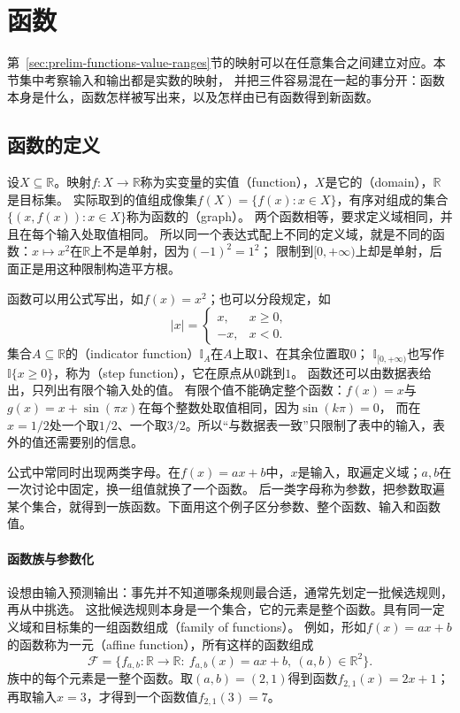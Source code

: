 \section{函数}
\label{sec:ru-functions}

第~\ref{sec:prelim-functions-value-ranges}节的映射可以在任意集合之间建立对应。本节集中考察输入和输出都是实数的映射，
并把三件容易混在一起的事分开：函数本身是什么，函数怎样被写出来，以及怎样由已有函数得到新函数。

\subsection{函数的定义}
\label{sec:ru-function-definition}

设$X\subseteq\mathbb R$。映射$f:X\to\mathbb R$称为实变量的实值（function），$X$是它的（domain），$\mathbb R$是目标集。
实际取到的值组成像集$f(X)=\{f(x):x\in X\}$，有序对组成的集合$\{(x,f(x)):x\in X\}$称为函数的（graph）。
两个函数相等，要求定义域相同，并且在每个输入处取值相同。
所以同一个表达式配上不同的定义域，就是不同的函数：$x\mapsto x^2$在$\mathbb R$上不是单射，因为$(-1)^2=1^2$；
限制到$[0,+\infty)$上却是单射，后面正是用这种限制构造平方根。

函数可以用公式写出，如$f(x)=x^2$；也可以分段规定，如
\[
 |x|=\begin{cases}x,&x\geq0,\\-x,&x<0.\end{cases}
\]
集合$A\subseteq\mathbb R$的（indicator function）$\mathbb I_A$在$A$上取$1$、在其余位置取$0$；
$\mathbb I_{[0,+\infty)}$也写作$\mathbb I\{x\geq0\}$，称为（step function），它在原点从$0$跳到$1$。
函数还可以由数据表给出，只列出有限个输入处的值。
有限个值不能确定整个函数：$f(x)=x$与$g(x)=x+\sin(\pi x)$在每个整数处取值相同，因为$\sin(k\pi)=0$，
而在$x=1/2$处一个取$1/2$、一个取$3/2$。所以“与数据表一致”只限制了表中的输入，表外的值还需要别的信息。

公式中常同时出现两类字母。在$f(x)=ax+b$中，$x$是输入，取遍定义域；$a,b$在一次讨论中固定，换一组值就换了一个函数。
后一类字母称为参数，把参数取遍某个集合，就得到一族函数。下面用这个例子区分参数、整个函数、输入和函数值。

\paragraph{函数族与参数化}
\label{sec:prelim-function-families}
设想由输入预测输出：事先并不知道哪条规则最合适，通常先划定一批候选规则，再从中挑选。
这批候选规则本身是一个集合，它的元素是整个函数。具有同一定义域和目标集的一组函数组成（family of functions）。
例如，形如$f(x)=ax+b$的函数称为一元（affine function），所有这样的函数组成
\[
 \mathcal F=\{f_{a,b}:\mathbb R\to\mathbb R:\ f_{a,b}(x)=ax+b,\ (a,b)\in\mathbb R^2\}.
\]
族中的每个元素是一整个函数。取$(a,b)=(2,1)$得到函数$f_{2,1}(x)=2x+1$；再取输入$x=3$，才得到一个函数值$f_{2,1}(3)=7$。

